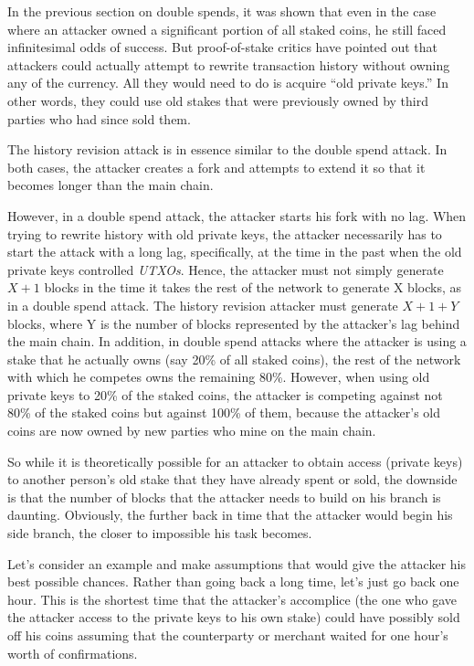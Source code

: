 \documentclass[a4paper,11pt]{article}
\begin{document}
In the previous section on double spends, it was shown that even in the case where an attacker owned a significant portion of all staked coins, he still faced infinitesimal odds of success. But proof-of-stake critics have pointed out that attackers could actually attempt to rewrite transaction history without owning any of the currency. All they would need to do is acquire “old private keys.” In other words, they could use old stakes that were previously owned by third parties who had since sold them.

The history revision attack is in essence similar to  the double spend attack. In both cases, the attacker creates a fork and attempts to extend it so that it becomes longer than the main chain.

However, in a double spend attack, the attacker starts his fork with no lag. When trying to rewrite history with old private keys, the attacker necessarily has to start the attack with a long lag, specifically, at the time in the past when the old private keys controlled \textit{UTXOs}. Hence, the attacker must not simply generate $X+1$ blocks in the time it takes the rest of the network to generate X blocks, as in a double spend attack. The history revision attacker must generate $X+1+Y$ blocks, where Y is the number of blocks represented by the attacker's lag behind the main chain. In addition, in double spend attacks where the attacker is using a stake that he actually owns (say 20\% of all staked coins), the rest of the network with which he competes owns the remaining 80\%. However, when using old private keys to 20\% of the staked coins, the attacker is competing against not 80\% of the staked coins but against 100\% of them, because the attacker's old coins are now owned by new parties who mine on the main chain.

So while it is theoretically possible for an attacker to obtain access (private keys) to another person's old stake that they have already spent or sold, the downside is that the number of blocks that the attacker needs to build on his branch is daunting. Obviously, the further back in time that the attacker would begin his side branch, the closer to impossible his task becomes.

Let's consider an example and make assumptions that would give the attacker his best possible chances. Rather than going back a long time, let's just go back one hour. This is the shortest time that the attacker's accomplice (the one who gave the attacker access to the private keys to his own stake) could have possibly sold off his coins assuming that the counterparty or merchant waited for one hour's worth of confirmations.
\end{document}
